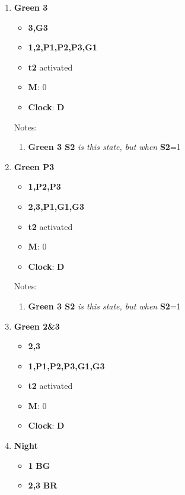 \documentclass[letterpaper]{article}
\begin{document}
\begin{enumerate}
       
 \item \textbf{Green 3}
       \begin{itemize}
        \item {\color{green}\textbf{3,G3}}
        \item {\color{red}\textbf{1,2,P1,P2,P3,G1}}
        \item \textbf{t2} activated
        \item \textbf{M}: 0
        \item \textbf{Clock}: \textbf{D}
       \end{itemize}
       Notes:
       \begin{enumerate}
        \item \textbf{Green 3 S2} \textit{is this state, but when} \textbf{S2}=1
       \end{enumerate}
 \item \textbf{Green P3}
       \begin{itemize}
        \item {\color{green}\textbf{1,P2,P3}}
        \item {\color{red}\textbf{2,3,P1,G1,G3}}
        \item \textbf{t2} activated
        \item \textbf{M}: 0
        \item \textbf{Clock}: \textbf{D}
       \end{itemize}
       Notes:
       \begin{enumerate}
        \item \textbf{Green 3 S2} \textit{is this state, but when} \textbf{S2}=1
       \end{enumerate}
 \item \textbf{Green 2\&3}
       \begin{itemize}
        \item {\color{green}\textbf{2,3}}
        \item {\color{red}\textbf{1,P1,P2,P3,G1,G3}}
        \item \textbf{t2} activated
        \item \textbf{M}: 0
        \item \textbf{Clock}: \textbf{D}
       \end{itemize}
 \item \textbf{Night}
       \begin{itemize}
        \item {\color{green}\textbf{1}} \textbf{BG}
        \item {\color{red}\textbf{2,3}} \textbf{BR}

\end{itemize}
\end{enumerate}
\end{document}
